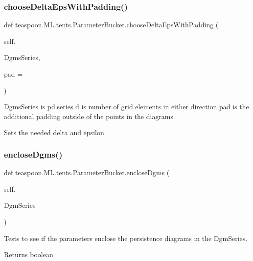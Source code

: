 \subsubsection{\texorpdfstring{choose\+Delta\+Eps\+With\+Padding()}{chooseDeltaEpsWithPadding()}}
{\footnotesize\ttfamily def teaspoon.\+M\+L.\+tents.\+Parameter\+Bucket.\+choose\+Delta\+Eps\+With\+Padding (\begin{DoxyParamCaption}\item[{}]{self,  }\item[{}]{Dgms\+Series,  }\item[{}]{pad = {} }\end{DoxyParamCaption})}

\begin{DoxyVerb}DgmsSeries is pd.series
d is number of grid elements in either direction
pad is the additional padding outside of the points in the diagrams

Sets the needed delta and epsilon\end{DoxyVerb}
 \mbox{\label{classteaspoon_1_1_m_l_1_1tents_1_1_parameter_bucket_afbc1ce46c67e2a86a72d93cdcba558ea}} 
\subsubsection{\texorpdfstring{enclose\+Dgms()}{encloseDgms()}}
{\footnotesize\ttfamily def teaspoon.\+M\+L.\+tents.\+Parameter\+Bucket.\+enclose\+Dgms (\begin{DoxyParamCaption}\item[{}]{self,  }\item[{}]{Dgm\+Series }\end{DoxyParamCaption})}



Tests to see if the parameters enclose the persistence diagrams in the Dgm\+Series. 

\begin{DoxyReturn}{Returns}
boolean 
\end{DoxyReturn}
\mbox{\label{classteaspoon_1_1_m_l_1_1tents_1_1_parameter_bucket_a3fc98af840bf6f0f9f552e2e2f664fe8}} 
